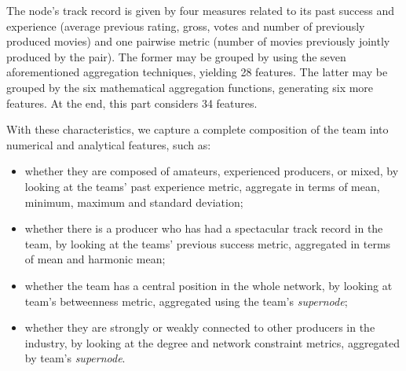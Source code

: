 



The node's track record is given by four measures related to its past success
and experience (average previous rating, gross, votes and number of previously
produced movies) and one pairwise metric (number of movies previously jointly
produced by the pair). The former may be grouped by using the seven
aforementioned aggregation techniques, yielding 28 features. The latter may be
grouped by the six mathematical aggregation functions, generating six more
features. At the end, this part considers 34 features.

With these characteristics, we capture a complete composition of the team into
numerical and analytical features, such as: 

\begin{itemize}
\item whether they are composed of amateurs, experienced producers, or mixed,
by looking at the teams' past experience metric, aggregate in terms of
mean, minimum, maximum and standard deviation;
\item whether there is a producer who has had a spectacular track record in the
team, by looking at the teams' previous success metric, aggregated in terms of
mean and harmonic mean;
\item whether the team has a central position in the whole network, by looking
at team's betweenness metric, aggregated using the team's \textit{supernode};
\item whether they are strongly or weakly connected to other producers in the
industry, by looking at the degree and network constraint metrics,
aggregated by team's \textit{supernode}.
\end{itemize}
